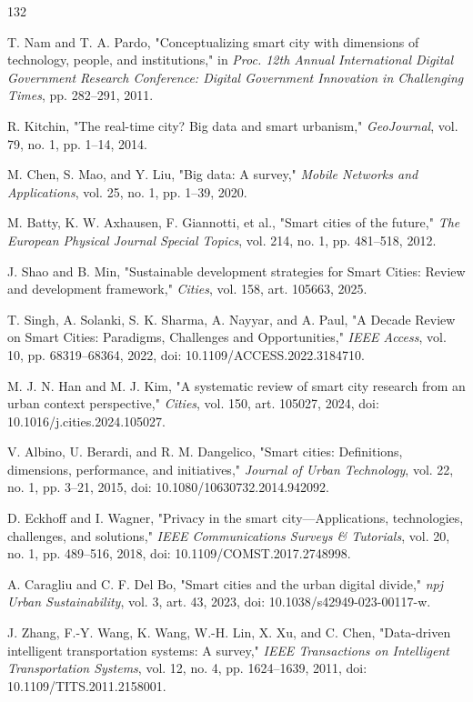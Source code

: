 \documentclass[pdflatex,sn-mathphys-num]{sn-jnl}%
\theoremstyle{thmstyleone}%
\theoremstyle{thmstyletwo}%
\theoremstyle{thmstylethree}%
\begin{document}
\begin{thebibliography}{132}

 T. Nam and T. A. Pardo, "Conceptualizing smart city with dimensions of technology, people, and institutions," in \emph{Proc. 12th Annual International Digital Government Research Conference: Digital Government Innovation in Challenging Times}, pp. 282--291, 2011.

 R. Kitchin, "The real-time city? Big data and smart urbanism," \emph{GeoJournal}, vol. 79, no. 1, pp. 1--14, 2014.

 M. Chen, S. Mao, and Y. Liu, "Big data: A survey," \emph{Mobile Networks and Applications}, vol. 25, no. 1, pp. 1--39, 2020.

 M. Batty, K. W. Axhausen, F. Giannotti, et al., "Smart cities of the future," \emph{The European Physical Journal Special Topics}, vol. 214, no. 1, pp. 481--518, 2012.

 J. Shao and B. Min, "Sustainable development strategies for Smart Cities: Review and development framework," \emph{Cities}, vol. 158, art. 105663, 2025.

 T. Singh, A. Solanki, S. K. Sharma, A. Nayyar, and A. Paul, "A Decade Review on Smart Cities: Paradigms, Challenges and Opportunities," \emph{IEEE Access}, vol. 10, pp. 68319--68364, 2022, doi: 10.1109/ACCESS.2022.3184710.

 M. J. N. Han and M. J. Kim, "A systematic review of smart city research from an urban context perspective," \emph{Cities}, vol. 150, art. 105027, 2024, doi: 10.1016/j.cities.2024.105027.

 V. Albino, U. Berardi, and R. M. Dangelico, "Smart cities: Definitions, dimensions, performance, and initiatives," \emph{Journal of Urban Technology}, vol. 22, no. 1, pp. 3--21, 2015, doi: 10.1080/10630732.2014.942092.

 D. Eckhoff and I. Wagner, "Privacy in the smart city---Applications, technologies, challenges, and solutions," \emph{IEEE Communications Surveys \& Tutorials}, vol. 20, no. 1, pp. 489--516, 2018, doi: 10.1109/COMST.2017.2748998.

 A. Caragliu and C. F. Del Bo, "Smart cities and the urban digital divide," \emph{npj Urban Sustainability}, vol. 3, art. 43, 2023, doi: 10.1038/s42949-023-00117-w.

 J. Zhang, F.-Y. Wang, K. Wang, W.-H. Lin, X. Xu, and C. Chen, "Data-driven intelligent transportation systems: A survey," \emph{IEEE Transactions on Intelligent Transportation Systems}, vol. 12, no. 4, pp. 1624--1639, 2011, doi: 10.1109/TITS.2011.2158001.


\end{thebibliography}
\end{document}
